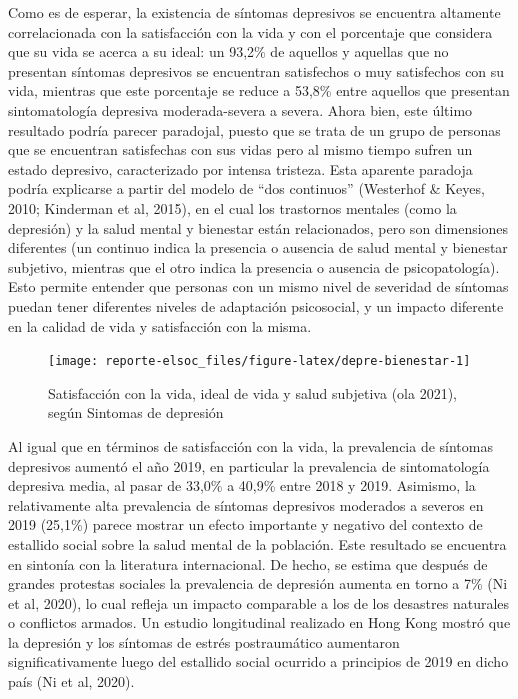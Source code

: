 \documentclass[
  12pt,
]{book}
\begin{document}
Como es de esperar, la existencia de síntomas depresivos se encuentra altamente correlacionada con la satisfacción con la vida y con el porcentaje que considera que su vida se acerca a su ideal: un 93,2\% de aquellos y aquellas que no presentan síntomas depresivos se encuentran satisfechos o muy satisfechos con su vida, mientras que este porcentaje se reduce a 53,8\% entre aquellos que presentan sintomatología depresiva moderada-severa a severa. Ahora bien, este último resultado podría parecer paradojal, puesto que se trata de un grupo de personas que se encuentran satisfechas con sus vidas pero al mismo tiempo sufren un estado depresivo, caracterizado por intensa tristeza. Esta aparente paradoja podría explicarse a partir del modelo de ``dos continuos'' (Westerhof \& Keyes, 2010; Kinderman et al, 2015), en el cual los trastornos mentales (como la depresión) y la salud mental y bienestar están relacionados, pero son dimensiones diferentes (un continuo indica la presencia o ausencia de salud mental y bienestar subjetivo, mientras que el otro indica la presencia o ausencia de psicopatología). Esto permite entender que personas con un mismo nivel de severidad de síntomas puedan tener diferentes niveles de adaptación psicosocial, y un impacto diferente en la calidad de vida y satisfacción con la misma.

\begin{figure}

{\centering \texttt{[image: reporte-elsoc\_files/figure-latex/depre-bienestar-1]} 

}

\caption{Satisfacción con la vida, ideal de vida y salud subjetiva (ola 2021), según Sintomas de depresión}\label{fig:depre-bienestar}
\end{figure}

Al igual que en términos de satisfacción con la vida, la prevalencia de síntomas depresivos aumentó el año 2019, en particular la prevalencia de sintomatología depresiva media, al pasar de 33,0\% a 40,9\% entre 2018 y 2019. Asimismo, la relativamente alta prevalencia de síntomas depresivos moderados a severos en 2019 (25,1\%) parece mostrar un efecto importante y negativo del contexto de estallido social sobre la salud mental de la población. Este resultado se encuentra en sintonía con la literatura internacional. De hecho, se estima que después de grandes protestas sociales la prevalencia de depresión aumenta en torno a 7\% (Ni et al, 2020), lo cual refleja un impacto comparable a los de los desastres naturales o conflictos armados. Un estudio longitudinal realizado en Hong Kong mostró que la depresión y los síntomas de estrés postraumático aumentaron significativamente luego del estallido social ocurrido a principios de 2019 en dicho país (Ni et al, 2020).
\end{document}

